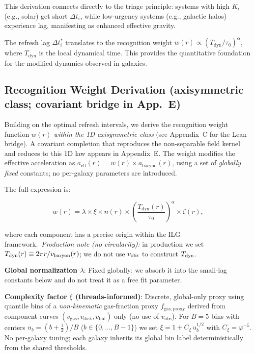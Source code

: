 \documentclass[fleqn,usenatbib]{mnras}
\begin{document}
This derivation connects directly to the triage principle: systems with high $K_i$ (e.g., solar) get short $\Delta t_i$, while low-urgency systems (e.g., galactic halos) experience lag, manifesting as enhanced effective gravity.

The refresh lag $\Delta t_i^*$ translates to the recognition weight $w(r) \propto (T_\mathrm{dyn}/\tau_0)^\alpha$, where $T_\mathrm{dyn}$ is the local dynamical time. This provides the quantitative foundation for the modified dynamics observed in galaxies.

\subsection{Recognition Weight Derivation (axisymmetric class; covariant bridge in App.~E)}

Building on the optimal refresh intervals, we derive the recognition weight function $w(r)$ \emph{within the 1D axisymmetric class} (see Appendix~C for the Lean bridge). A covariant completion that reproduces the non-separable field kernel and reduces to this 1D law appears in Appendix~E. The weight modifies the effective acceleration as $a_\mathrm{eff}(r) = w(r) \times a_\mathrm{baryon}(r)$, using a set of \emph{globally fixed} constants; no per-galaxy parameters are introduced.

The full expression is:

\begin{equation}
w(r) = \lambda \times \xi \times n(r) \times \left(\frac{T_\mathrm{dyn}(r)}{\tau_0}\right)^\alpha \times \zeta(r),
\end{equation}

where each component has a precise origin within the ILG framework.\ \textit{Production note (no circularity):} in production we set $T_{\rm dyn}(r)\equiv 2\pi r/ v_{\rm baryon}(r)$; we do not use $v_{\rm obs}$ to construct $T_{\rm dyn}$.

\textbf{Global normalization $\lambda$}: Fixed globally; we absorb it into the small-lag constants below and do not treat it as a free fit parameter.

\textbf{Complexity factor $\xi$ (threads-informed)}: Discrete, global-only proxy using quantile bins of a \emph{non-kinematic} gas-fraction proxy $f_\mathrm{gas,proxy}$ derived from component curves $(v_\mathrm{gas},v_\mathrm{disk},v_\mathrm{bul})$ only (no use of $v_\mathrm{obs}$). For $B=5$ bins with centers $u_b=(b+\tfrac{1}{2})/B$ ($b\in\{0,\dots,B{-}1\}$) we set $\xi = 1 + C_\xi\,u_b^{1/2}$ with $C_\xi = \varphi^{-5}$. No per-galaxy tuning; each galaxy inherits its global bin label deterministically from the shared thresholds.
\end{document}
